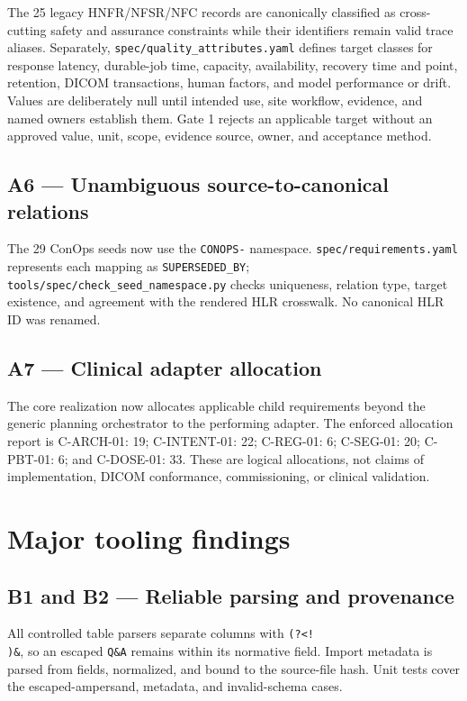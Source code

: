 \documentclass[11pt,letterpaper]{article}
\begin{document}
The 25 legacy HNFR/NFSR/NFC records are canonically classified as cross-cutting safety and assurance constraints while their identifiers remain valid trace aliases. Separately, \nolinkurl{spec/quality_attributes.yaml} defines target classes for response latency, durable-job time, capacity, availability, recovery time and point, retention, DICOM transactions, human factors, and model performance or drift. Values are deliberately null until intended use, site workflow, evidence, and named owners establish them. Gate 1 rejects an applicable target without an approved value, unit, scope, evidence source, owner, and acceptance method.

\subsection{A6 --- Unambiguous source-to-canonical relations}

The 29 ConOps seeds now use the \texttt{CONOPS-} namespace. \nolinkurl{spec/requirements.yaml} represents each mapping as \texttt{SUPERSEDED\_BY}; \nolinkurl{tools/spec/check_seed_namespace.py} checks uniqueness, relation type, target existence, and agreement with the rendered HLR crosswalk. No canonical HLR ID was renamed.

\subsection{A7 --- Clinical adapter allocation}

The core realization now allocates applicable child requirements beyond the generic planning orchestrator to the performing adapter. The enforced allocation report is C-ARCH-01: 19; C-INTENT-01: 22; C-REG-01: 6; C-SEG-01: 20; C-PBT-01: 6; and C-DOSE-01: 33. These are logical allocations, not claims of implementation, DICOM conformance, commissioning, or clinical validation.

\section{Major tooling findings}

\subsection{B1 and B2 --- Reliable parsing and provenance}

All controlled table parsers separate columns with \texttt{(?<!\\)\&}, so an escaped \texttt{Q\string\&A} remains within its normative field. Import metadata is parsed from \texttt{\string\NLMeta} fields, normalized, and bound to the source-file hash. Unit tests cover the escaped-ampersand, metadata, and invalid-schema cases.
\end{document}
